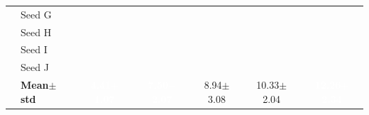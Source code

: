 \begin{table}[H]
{\begin{tabular}{@{}llccccc@{}}
  & Seed G & \cellcolor{RoyalBlue!10}{\small 3.96} & \cellcolor{RoyalBlue!10}{\small 7.00} & \cellcolor{RoyalBlue!10}{\small 7.63} & \cellcolor{RoyalBlue!10}{\small 9.15} & \cellcolor{RoyalBlue!10}{\small 10.99} \\
  & Seed H & \cellcolor{RoyalBlue!10}{\small 3.30} & \cellcolor{RoyalBlue!10}{\small 5.89} & \cellcolor{RoyalBlue!10}{\small 7.25} & \cellcolor{RoyalBlue!10}{\small 9.06} & \cellcolor{RoyalBlue!10}{\small 10.55} \\
  & Seed I & \cellcolor{RoyalBlue!10}{\small 4.05} & \cellcolor{RoyalBlue!10}{\small 6.05} & \cellcolor{RoyalBlue!10}{\small 6.91} & \cellcolor{RoyalBlue!10}{\small 8.46} & \cellcolor{RoyalBlue!10}{\small 10.94} \\
  & Seed J & \cellcolor{RoyalBlue!10}{\small 3.77} & \cellcolor{RoyalBlue!10}{\small 7.99} & \cellcolor{RoyalBlue!10}{\small 7.03} & \cellcolor{RoyalBlue!10}{\small 10.73} & \cellcolor{RoyalBlue!10}{\small 11.46} \\
 & \textbf{Mean$\pm$std} & \cellcolor{RoyalBlue!65}\textcolor{white}{\textbf{4.41$\pm$1.07}} & \cellcolor{RoyalBlue!65}\textcolor{white}{\textbf{7.50$\pm$2.07}} & \cellcolor{RoyalBlue!20}8.94$\pm$3.08 & \cellcolor{RoyalBlue!20}10.33$\pm$2.04 & \cellcolor{RoyalBlue!65}\textcolor{white}{\textbf{12.26$\pm$2.34}} \\
\bottomrule
\end{tabular}
}
\end{table}

